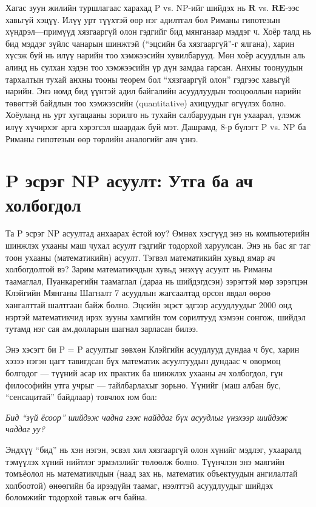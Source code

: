 Хагас зуун жилийн туршлагаас харахад P vs. NP-ийг шийдэх нь $\mathbf{R}$ vs. $\mathbf{RE}$-ээс хавьгүй хэцүү. Илүү урт түүхтэй өөр нэг адилтгал бол Риманы гипотезын хүндрэл—примүүд хязгааргүй олон гэдгийг бид мянганаар мэддэг ч. Хоёр талд нь бид мэддэг зүйлс чанарын шинжтэй (“эцсийн ба хязгааргүй”-г ялгана), харин хүсэж буй нь илүү нарийн тоо хэмжээсийн хувилбарууд. Мөн хоёр асуудлын аль алинд нь сулхан хэдэн тоо хэмжээсийн үр дүн замдаа гарсан. Анхны тоонуудын тархалтын тухай анхны тооны теорем бол “хязгааргүй олон” гэдгээс хавьгүй нарийн. Энэ номд бид үүнтэй адил байгалийн асуудлуудын тооцооллын нарийн төвөгтэй байдлын тоо хэмжээсийн (quantitative) ахицуудыг өгүүлэх болно. Хоёуланд нь урт хугацааны зорилго нь тухайн салбаруудын гүн ухаарал, үлэмж илүү хүчирхэг арга хэрэгсэл шаардаж буй мэт. Дашрамд, 8-р бүлэгт P vs. NP ба Риманы гипотезын өөр төрлийн аналогийг авч үзнэ.


\section{$\mathbf{P}$ эсрэг $\mathbf{NP}$ асуулт: Утга ба ач холбогдол}


Та P эсрэг NP асуултад анхаарах ёстой юу? Өмнөх хэсгүүд энэ нь компьютерийн шинжлэх ухааны маш чухал асуулт гэдгийг тодорхой харуулсан. Энэ нь бас яг таг тоон ухааны (математикийн) асуулт. Тэгвэл математикийн хувьд ямар ач холбогдолтой вэ? Зарим математикчдын хувьд энэхүү асуулт нь Риманы таамаглал, Пуанкарегийн таамаглал (дараа нь шийдэгдсэн) зэрэгтэй мөр зэрэгцэн Клэйгийн Мянганы Шагналт 7 асуудлын жагсаалтад \cite{CJW06} орсон явдал өөрөө хангалттай шалтгаан байж болно. Эцсийн эцэст эдгээр асуудлуудыг 2000 онд нэртэй математикчид ирэх зууны хамгийн том сорилтууд хэмээн сонгож, шийдэл тутамд нэг сая ам.долларын шагнал зарласан билээ.


Энэ хэсэгт би P =  P асуултыг зөвхөн Клэйгийн асуудлууд дундаа ч бус, харин хэзээ нэгэн цагт тавигдсан бүх математик асуултуудын дундаас ч өвөрмөц болгодог — түүний асар их практик ба шинжлэх ухааны ач холбогдол, гүн философийн утга учрыг — тайлбарлахыг зорьно. Үүнийг (маш албан бус, “сенсацитай” байдлаар) товчлох юм бол:


\begin{center}
\textit{Бид “зүй ёсоор” шийдэж чадна гэж найддаг бүх асуудлыг үнэхээр шийдэж чаддаг уу?}
\end{center}


Эндхүү “бид” нь хэн нэгэн, эсвэл хил хязгааргүй олон хүнийг мэдлэг, ухааралд тэмүүлэх хүний нийтлэг эрмэлзлийг төлөөлж болно. Түүнчлэн энэ маягийн томъёолол нь математикчдын (наад зах нь, математик объектуудын ангилалтай холбоотой) өнөөгийн ба ирээдүйн таамаг, нээлттэй асуудлуудыг шийдэх боломжийг тодорхой тавьж өгч байна.


